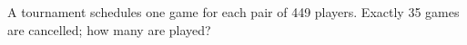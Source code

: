 A tournament schedules one game for each pair of 449 players. Exactly 35 games are cancelled; how many are played?
